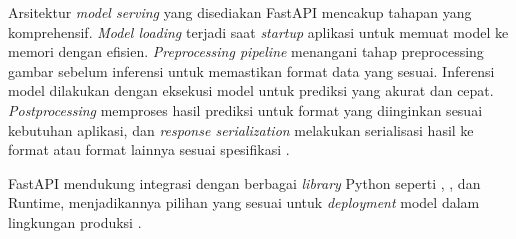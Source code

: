 Arsitektur \emph{model serving} yang disediakan FastAPI mencakup tahapan yang komprehensif. \emph{Model loading} terjadi saat \emph{startup} aplikasi untuk memuat model \ml ke memori dengan efisien. \emph{Preprocessing pipeline} menangani tahap preprocessing gambar sebelum inferensi untuk memastikan format data yang sesuai. Inferensi model dilakukan dengan eksekusi model \ml untuk prediksi yang akurat dan cepat. \emph{Postprocessing} memproses hasil prediksi untuk format yang diinginkan sesuai kebutuhan aplikasi, dan \emph{response serialization} melakukan serialisasi hasil ke format \json atau format lainnya sesuai spesifikasi \api.

FastAPI mendukung integrasi dengan berbagai \emph{library} \ml Python seperti \pytorch, \tensorflow, dan \onnx Runtime, menjadikannya pilihan yang sesuai untuk \emph{deployment} model \cv dalam lingkungan produksi \parencite{techempowerbenchmark2023}.
